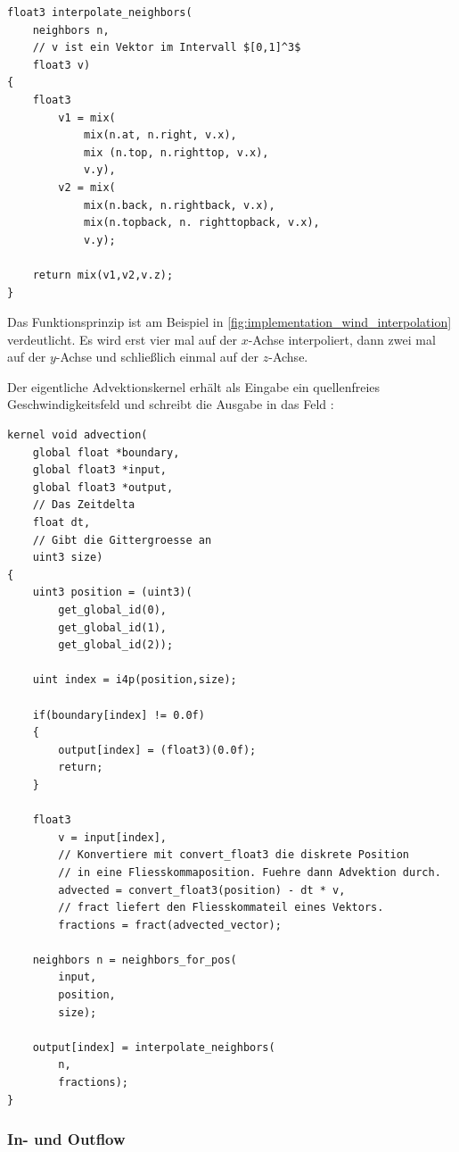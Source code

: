 \begin{verbatim}
float3 interpolate_neighbors(
    neighbors n,
    // v ist ein Vektor im Intervall $[0,1]^3$
    float3 v)
{
    float3
        v1 = mix(
            mix(n.at, n.right, v.x),
            mix (n.top, n.righttop, v.x),
            v.y),
        v2 = mix(
            mix(n.back, n.rightback, v.x),
            mix(n.topback, n. righttopback, v.x),
            v.y);

    return mix(v1,v2,v.z);
}
\end{verbatim}

Das Funktionsprinzip ist am Beispiel in
\cref{fig:implementation_wind_interpolation} verdeutlicht. Es wird
erst vier mal auf der $x$-Achse interpoliert, dann zwei mal auf der
$y$-Achse und schließlich einmal auf der $z$-Achse.

Der eigentliche Advektionskernel erhält als Eingabe ein quellenfreies
Geschwindigkeitsfeld  und schreibt die
Ausgabe in das Feld :

\begin{verbatim}
kernel void advection(
    global float *boundary,
    global float3 *input,
    global float3 *output,
    // Das Zeitdelta
    float dt,
    // Gibt die Gittergroesse an
    uint3 size)
{
    uint3 position = (uint3)(
        get_global_id(0),
        get_global_id(1),
        get_global_id(2));

    uint index = i4p(position,size);

    if(boundary[index] != 0.0f)
    {
        output[index] = (float3)(0.0f);
        return;
    }

    float3
        v = input[index],
        // Konvertiere mit convert_float3 die diskrete Position
        // in eine Fliesskommaposition. Fuehre dann Advektion durch.
        advected = convert_float3(position) - dt * v,
        // fract liefert den Fliesskommateil eines Vektors.
        fractions = fract(advected_vector);

    neighbors n = neighbors_for_pos(
        input,
        position,
        size);

    output[index] = interpolate_neighbors(
        n,
        fractions);
}
\end{verbatim}

\subsubsection{In- und Outflow}
\label{sec:implementaion_wind_in_outflow}

